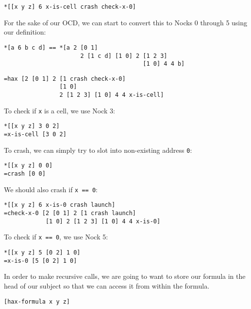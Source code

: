 \documentclass[twoside]{article}
\begin{document}
\begin{lstlisting}[style=listingblock]
*[[x y z] 6 x-is-cell crash check-x-0]
\end{lstlisting}

For the sake of our OCD, we can start to convert this to Nocks 0 through 5 using our definition:

\begin{lstlisting}[style=listingcode]
*[a 6 b c d] == *[a 2 [0 1]
                      2 [1 c d] [1 0] 2 [1 2 3]
                                        [1 0] 4 4 b]
\end{lstlisting}

\begin{lstlisting}[style=listingblock]
=hax [2 [0 1] 2 [1 crash check-x-0]
                [1 0]
                2 [1 2 3] [1 0] 4 4 x-is-cell]
\end{lstlisting}

To check if \lstinline[style=inlinecode]{x} is a cell, we use Nock 3:

\begin{lstlisting}[style=listingblock]
*[[x y z] 3 0 2]
=x-is-cell [3 0 2]
\end{lstlisting}

To crash, we can simply try to slot into non-existing address \lstinline[style=inlinecode]{0}:

\begin{lstlisting}[style=listingblock]
*[[x y z] 0 0]
=crash [0 0]
\end{lstlisting}

We should also crash if \lstinline[style=inlinecode]{x == 0}:

\begin{lstlisting}[style=listingblock]
*[[x y z] 6 x-is-0 crash launch]
=check-x-0 [2 [0 1] 2 [1 crash launch]
            [1 0] 2 [1 2 3] [1 0] 4 4 x-is-0]
\end{lstlisting}

To check if \lstinline[style=inlinecode]{x == 0}, we use Nock 5:

\begin{lstlisting}[style=listingblock]
*[[x y z] 5 [0 2] 1 0]
=x-is-0 [5 [0 2] 1 0]
\end{lstlisting}

In order to make recursive calls, we are going to want to store our formula in the head of our subject so that we can access it from within the formula.

\begin{lstlisting}[style=listingblock]
[hax-formula x y z]
\end{lstlisting}
\end{document}
